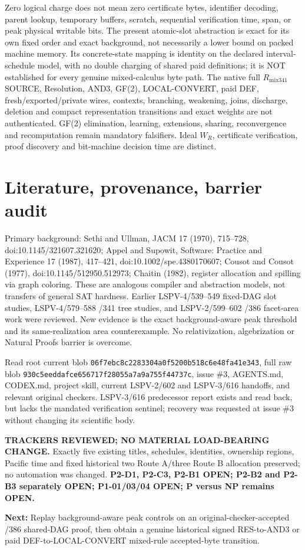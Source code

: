 \documentclass[11pt]{article}
\begin{document}
Zero logical charge does not mean zero certificate bytes, identifier decoding, parent lookup, temporary buffers, scratch, sequential verification time, span, or peak physical writable bits. The present atomic-slot abstraction is exact for its own fixed order and exact background, not necessarily a lower bound on packed machine memory. Its concrete-state mapping is identity on the declared interval-schedule model, with no double charging of shared paid definitions; it is NOT established for every genuine mixed-calculus byte path. The native full $R_{\mathrm{mix341}}$ SOURCE, Resolution, AND3, GF(2), LOCAL-CONVERT, paid DEF, fresh/exported/private wires, contexts, branching, weakening, joins, discharge, deletion and compact representation transitions and exact weights are not authenticated. GF(2) elimination, learning, extensions, sharing, reconvergence and recomputation remain mandatory falsifiers. Ideal $W_R$, certificate verification, proof discovery and bit-machine decision time are distinct.

\section*{Literature, provenance, barrier audit}
Primary background: Sethi and Ullman, JACM 17 (1970), 715--728, doi:10.1145/321607.321620; Appel and Supowit, Software: Practice and Experience 17 (1987), 417--421, doi:10.1002/spe.4380170607; Cousot and Cousot (1977), doi:10.1145/512950.512973; Chaitin (1982), register allocation and spilling via graph coloring. These are analogous compiler and abstraction models, not transfers of general SAT hardness. Earlier LSPV-4/539--549 fixed-DAG slot studies, LSPV-4/579--588 /341 tree studies, and LSPV-2/599--602 /386 facet-area work were reviewed. New evidence is the exact background-aware peak threshold and its same-realization area counterexample. No relativization, algebrization or Natural Proofs barrier is overcome.

Read root  current blob \texttt{06f7ebc8c2283304a0f5200b518c6e48fa41e343},  full raw blob \texttt{930c5eeddafce656717f28055a7a9a755f44737c}, issue \#3, AGENTS.md, CODEX.md, project skill, current LSPV-2/602 and LSPV-3/616 handoffs, and relevant original checkers. LSPV-3/616 predecessor report exists and read back, but lacks the mandated verification sentinel; recovery was requested at issue \#3 without changing its scientific body.

\textbf{TRACKERS REVIEWED; NO MATERIAL LOAD-BEARING CHANGE.} Exactly five existing titles, schedules, identities, ownership regions, Pacific time and fixed historical two Route A/three Route B allocation preserved; no automation was changed. \textbf{P2-D1, P2-C3, P2-B1 OPEN; P2-B2 and P2-B3 separately OPEN; P1-01/03/04 OPEN; P versus NP remains OPEN.}

\textbf{Next:} Replay background-aware peak controls on an original-checker-accepted /386 shared-DAG proof, then obtain a genuine historical signed RES-to-AND3 or paid DEF-to-LOCAL-CONVERT mixed-rule accepted-byte transition.
\end{document}
